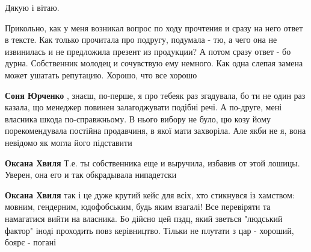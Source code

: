 \begin{itemize}
 
Дякую і вітаю.

 

Прикольно, как у меня возникал вопрос по ходу прочтения и сразу на него ответ в
тексте. Как только прочитала про подругу, подумала - тю, а чего она не
извинилась и не предложила презент из продукции? А потом сразу ответ - бо
дурна. Собственник молодец и сочувствую ему немного. Как одна слепая замена
может ушатать репутацию. Хорошо, что все хорошо

\begin{itemize}
 
\textbf{Соня Юрченко} , знаєш, по-перше, я про тебеяк раз згадувала, бо ти не
один раз казала, що менеджер повинен залагоджувати подібні речі. А по-друге,
мені власника шкода по-справжньому. В нього вибору не було, цю козу йому
порекомендувала постійна продавчиня, в якої мати захворіла. Але якби не я, вона
невідомо як могла його підставити

 
\textbf{Оксана Хвиля} Т.е. ты собственника еще и выручила, избавив от этой лошицы. \Smiley[1.0][yellow] Уверен, она его и так обкрадывала нипадетски

 
\textbf{Оксана Хвиля} так і це дуже крутий кейс для всіх, хто стикнувся із
хамством: мовним, гендерним, юдофобським, будь яким взагалі! Все перевіряти та
намагатися вийти на власника. Бо дійсно цей пздц, який зветься "людський
фактор" іноді проходить повз керівництво. Тільки не плутати з цар - хороший,
боярє - погані


\end{itemize}
\end{itemize}
